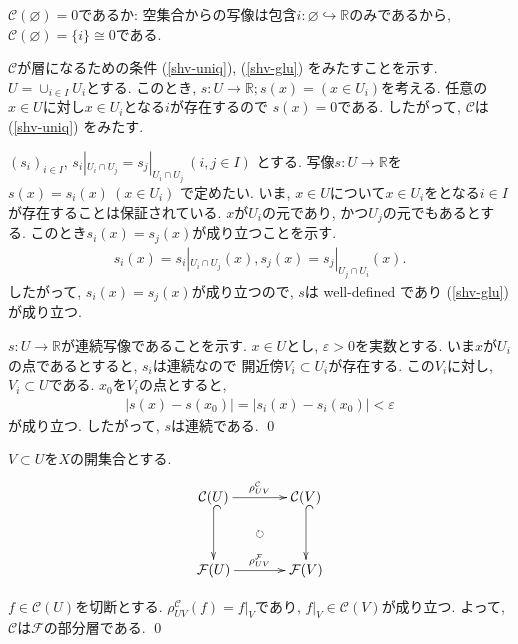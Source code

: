 \documentclass[12pt, a4paper, dvipdfmx]{jsarticle}
\makeatletter
\theoremstyle{definition}
\newcommand{\R}{\mathbb{R}}
\newcommand{\F}{\mathcal{F}}
\newcommand{\mcal}{\mathcal}
\newcommand{\e}{\varepsilon}
\newcommand{\inc}{\hookrightarrow}
\numberwithin{equation}{section} %
\renewenvironment{proof}[1][\proofname]{\par
  \normalfont
  \topsep6\p@\@plus6\p@ \trivlist
  \item[\hskip\labelsep{\textbf{#1}}\@addpunct{\textbf{. }}]\ignorespaces
}{%
  \endtrivlist
}
\renewcommand{\proofname}{証明}
\makeatother
\begin{document}
\begin{proof}
    $\mcal{C}(\varnothing) = 0$であるか: 
    空集合からの写像は包含$i\colon \varnothing\inc \R$のみであるから, 
    $\mcal{C}(\varnothing) = \{i\} \cong 0$である. 

    $\mcal{C}$が層になるための条件 
    (\ref{shv-uniq}), (\ref{shv-glu}) 
    をみたすことを示す. 
    $U = \cup_{i\in I} U_i$とする. 
    このとき, $s\colon U \to \R; s(x) = (x\in U_i)$を考える. 
    任意の$x\in U$に対し$x\in U_i$となる$i$が存在するので
    $s(x) = 0$である. 
    したがって, $\mcal{C}$は (\ref{shv-uniq}) をみたす. 

    $(s_i)_{i\in I}$, 
    $s_i|_{U_i\cap U_j} = s_j|_{U_i\cap U_j} 
    \ (i,j \in I)$
    とする. 写像$s\colon U \to \R$を
    $s(x) = s_i(x)\ (x\in U_i)$
    で定めたい. 
    いま, $x\in U$について$x\in U_i$をとなる$i\in I$
    が存在することは保証されている. 
    $x$が$U_i$の元であり, かつ$U_j$の元でもあるとする. 
    このとき$s_i(x) = s_j(x)$が成り立つことを示す. 
    \begin{align*}
        s_i(x) = s_i|_{U_i\cap U_j}(x), 
        s_j(x) = s_j|_{U_j\cap U_i}(x). 
    \end{align*} 
    したがって, $s_i(x) = s_j(x)$が成り立つので, 
    $s$は well-defined であり 
    (\ref{shv-glu}) が成り立つ. 

    $s\colon U \to \R$が連続写像であることを示す. 
    $x\in U$とし, $\e>0$を実数とする. 
    いま$x$が$U_i$の点であるとすると, $s_i$は連続なので
    開近傍$V_i\subset U_i$が存在する. 
    この$V_i$に対し, $V_i\subset U$である. 
    $x_0$を$V_i$の点とすると, 
    \begin{align*}
        | s(x)-s(x_0) | = | s_i(x)-s_i(x_0) | < \e
    \end{align*}
    が成り立つ. したがって, $s$は連続である. \qed
\end{proof}

\begin{proof}[関手$\F$について]
    $V\subset U$を$X$の開集合とする. 
    \begin{equation*}
        \vcenter{\xymatrix@C=36pt@R=36pt{
        \mcal{C}(U) \ar[r]^-{\rho^\mcal{C}_{UV}} \ar@{^{(}->}[d] 
        & 
        \mcal{C}(V) \ar@{^{(}->}[d] \\
        \F(U) \ar[r]^-{\rho^\F_{UV}}  
        & 
        \F(V)\ar@{}[lu]|{\circlearrowright}
        }}
    \end{equation*}
    
    $f\in\mcal{C}(U)$を切断とする. 
    $\rho^\mcal{C}_{UV}(f)=f|_V$であり, 
    $f|_V\in \mcal{C}(V)$が成り立つ. 
    よって, $\mcal{C}$は$\F$の部分層である. \qed
\end{proof}
\end{document}

